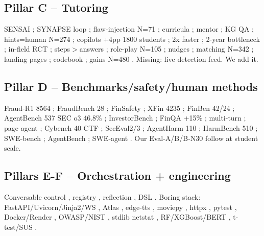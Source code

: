 \documentclass[11pt,a4paper]{article}
\begin{document}
\subsection{Pillar C -- Tutoring}
SENSAI \cite{SENSAI25}; SYNAPSE loop \cite{SYNAPSE26}; flaw-injection N=71 \cite{Frazier26}; curricula \cite{CurricuLLM26}; mentor \cite{CyberMentor25}; KG QA \cite{CyberQ24}; hints=human N=274 \cite{Pardos24}; copilots +4pp 1800 students \cite{TutorCopilot24}; 2x faster \cite{Kestin25}; 2-year bottleneck \cite{Khanmigo25}; in-field RCT \cite{Vanzo25}; steps$>$answers \cite{Blasco24}; role-play N=105 \cite{ChenCHI24}; nudges \cite{Lain24}; matching N=342 \cite{SchoniCHI25}; landing pages \cite{GrecoCEUR24}; codebook \cite{Codebook24}; gains N=480 \cite{Greco25}. Missing: live detection feed. We add it.
\subsection{Pillar D -- Benchmarks/safety/human methods}
Fraud-R1 8564 \cite{FraudR125}; FraudBench 28 \cite{FraudBench25}; FinSafety \cite{FinSafety26}; XFin 4235 \cite{XFin25}; FinBen 42/24 \cite{FinBen24}; AgentBench 537 SEC o3 46.8\% \cite{FinAgentBench25}; InvestorBench \cite{Investor25}; FinQA +15\% \cite{FinQA24}; multi-turn \cite{FraudRobust25}; page agent \cite{PageAgent25}; Cybench 40 CTF \cite{Cybench25}; SecEval2/3 \cite{SecEval225,SecEval325}; AgentHarm 110 \cite{AgentHarm25}; HarmBench 510 \cite{HarmBench24}; SWE-bench \cite{SWEbench24}; AgentBench \cite{AgentBench24}; SWE-agent \cite{SWEagent24}. Our Eval-A/B/B-N30 follow at student scale.
\subsection{Pillars E-F -- Orchestration + engineering}
Conversable control \cite{AutoGen24}, registry \cite{SAGA25}, reflection \cite{Aegis25}, DSL \cite{AIR26}. Boring stack: FastAPI/Uvicorn/Jinja2/WS \cite{FastAPI24}, Atlas \cite{Mongo24}, edge-tts \cite{EdgeTTS24}, moviepy \cite{Moviepy24}, httpx \cite{HTTPX24}, pytest \cite{Pytest24}, Docker/Render \cite{Docker24}, OWASP/NIST \cite{OWASP24,NIST24}, stdlib netstat \cite{PyStd24}, RF/XGBoost/BERT \cite{Algo25,FinFraud25,BERT24}, t-test/SUS \cite{EvalMethod24}.
\end{document}
